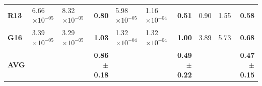 \documentclass[encoding=utf8,british]{tumphthesis}
\begin{document}
\begin{table}[H]
\begin{subtable}{1\textwidth}
{\begin{tabular}{|l|llr|llr|llr|}
\rowcolor[HTML]{CFE2F3} 
\textbf{R13} & 6.66$\times 10^{-05}$ & 8.32$\times 10^{-05}$ & \textbf{0.80} & 5.98$\times 10^{-05}$  & 1.16$\times 10^{-04}$ & \textbf{0.51}                                & 0.90  & 1.55  & \textbf{0.58} \\ 
\textbf{G16} & 3.39$\times 10^{-05}$ & 3.29$\times 10^{-05}$ & \textbf{1.03} & 1.32$\times 10^{-04}$  & 1.32$\times 10^{-04}$ & \textbf{1.00}                                & 3.89 & 5.73  & \textbf{0.68} \\ \hline
\rowcolor[HTML]{CFE2F3} 
\textbf{AVG}                             &                                                      &                                                       & \textbf{0.86$\pm$0.18}                           &                                                      &                                                       & \textbf{0.49$\pm$0.22}                           &                                                      &                                                       & \textbf{0.47$\pm$0.15}                          \\ \hline
\end{tabular}}
\end{subtable}

\bigskip
\begin{subtable}{1\textwidth}
\label{tab:benchmark-radmon-cpCSOO}


\end{subtable}
\end{table}
\end{document}

